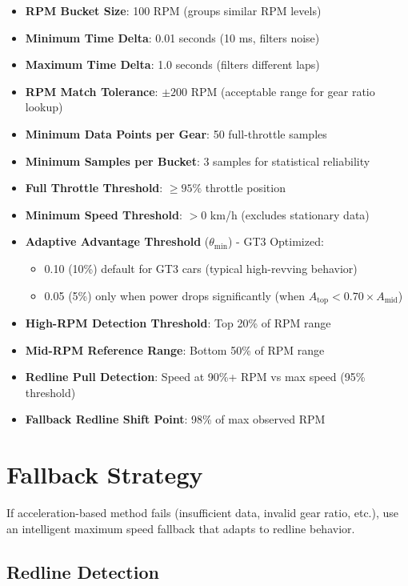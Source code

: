 \documentclass[12pt]{article}
\begin{document}
\begin{itemize}
    \item \textbf{RPM Bucket Size}: 100 RPM (groups similar RPM levels)
    \item \textbf{Minimum Time Delta}: 0.01 seconds (10 ms, filters noise)
    \item \textbf{Maximum Time Delta}: 1.0 seconds (filters different laps)
    \item \textbf{RPM Match Tolerance}: $\pm 200$ RPM (acceptable range for gear ratio lookup)
    \item \textbf{Minimum Data Points per Gear}: 50 full-throttle samples
    \item \textbf{Minimum Samples per Bucket}: 3 samples for statistical reliability
    \item \textbf{Full Throttle Threshold}: $\geq 95\%$ throttle position
    \item \textbf{Minimum Speed Threshold}: $> 0$ km/h (excludes stationary data)
    \item \textbf{Adaptive Advantage Threshold} ($\theta_{\min}$) - GT3 Optimized:
    \begin{itemize}
        \item 0.10 (10\%) default for GT3 cars (typical high-revving behavior)
        \item 0.05 (5\%) only when power drops significantly (when $A_{\text{top}} < 0.70 \times A_{\text{mid}}$)
    \end{itemize}
    \item \textbf{High-RPM Detection Threshold}: Top 20\% of RPM range
    \item \textbf{Mid-RPM Reference Range}: Bottom 50\% of RPM range
    \item \textbf{Redline Pull Detection}: Speed at 90\%+ RPM vs max speed (95\% threshold)
    \item \textbf{Fallback Redline Shift Point}: 98\% of max observed RPM
\end{itemize}

\section{Fallback Strategy}

If acceleration-based method fails (insufficient data, invalid gear ratio, etc.), use an intelligent maximum speed fallback that adapts to redline behavior.

\subsection{Redline Detection}
\end{document}
